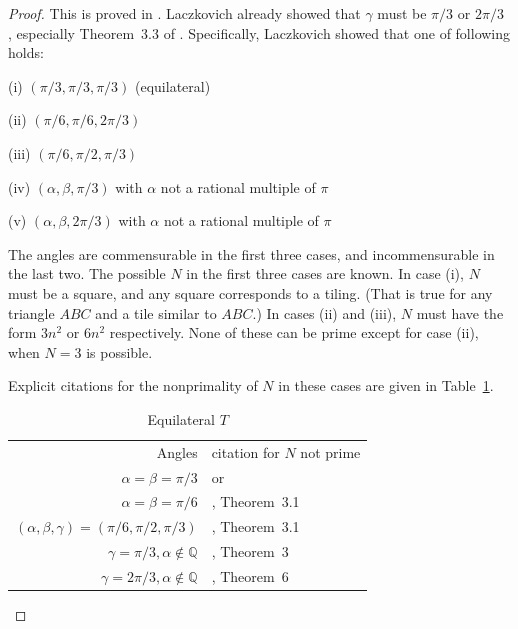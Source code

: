 \documentclass{amsart}
\theoremstyle{plain}
\theoremstyle{definition}
\theoremstyle{remark}
\newcommand{\Q}{\mathbb{Q}}
\def\Q{{\mathbb Q}}
\begin{document}
\begin{proof} This is proved in \cite{beeson-equilateral}.  Laczkovich already
showed that $\gamma$ must be $\pi/3$ or $2\pi/3$ \cite{laczkovich1995, laczkovich2012}, especially Theorem~3.3 of \cite{laczkovich2012}.
Specifically, Laczkovich showed that one of following holds:

\medskip

(i) $(\pi/3,\pi/3,\pi/3)$  (equilateral)

(ii) $(\pi/6,\pi/6,2\pi/3)$
\smallskip

(iii) $(\pi/6, \pi/2, \pi/3)$
\smallskip

(iv) $(\alpha, \beta, \pi/3)$ with $\alpha$ not a rational multiple of $\pi$
\smallskip

(v)  $(\alpha,\beta,2\pi/3)$ with $\alpha$ not a rational multiple of $\pi$
\smallskip

The angles are commensurable in the first three cases, and incommensurable 
in the last two. 
The possible $N$ in the first three cases are known.  In case (i),
$N$ must be a square, and any square corresponds to a tiling.  (That 
is true for any triangle $ABC$ and a tile similar to $ABC$.)  In cases (ii) and (iii),
$N$ must have the form $3n^2$ or $6n^2$ respectively.
None of these can be prime except for case (ii), when $N=3$ is possible.

Explicit citations for the nonprimality of $N$ in these cases
are given in Table~\ref{table:equilateral}.
\begin{table}[ht]
\caption{Equilateral $T$}
\begin{center}
\begin{tabular}{r l}
Angles  &  citation for $N$ not prime\\
$\alpha = \beta = \pi/3$  & \cite{snover1991} or \cite{soifer} \\
$\alpha = \beta = \pi/6$  & \cite{laczkovich2012}, Theorem~3.1 \\
$(\alpha,\beta,\gamma) =(\pi/6, \pi/2, \pi/3)$   & \cite{laczkovich2012}, Theorem~3.1  \\
$\gamma =\pi/3, \alpha \not\in \Q$ & \cite{beeson-triangletiling3}, Theorem~3\\
$\gamma = 2\pi/3, \alpha \not\in \Q$  & \cite{beeson-triangletiling3}, Theorem~6\
\end{tabular}
\end{center}
\label{table:equilateral}
\end{table}%
\end{proof}
\end{document}
